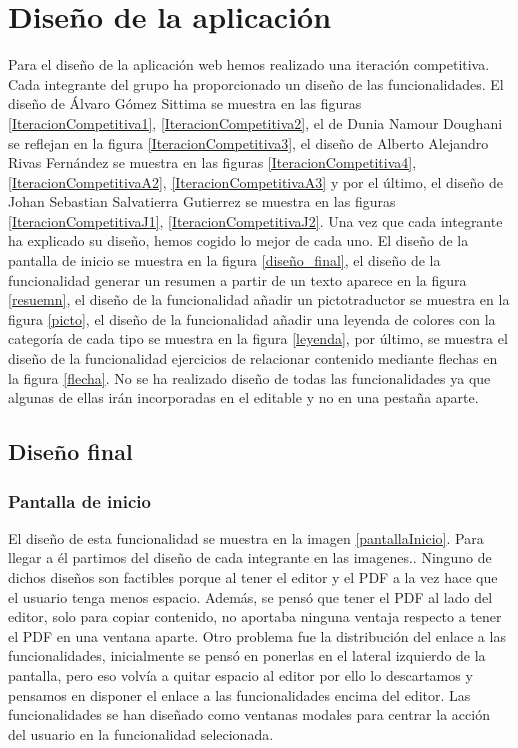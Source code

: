 \section{Diseño de la aplicación}
\label{disenyoDeLaAplicacion}
Para el diseño de la aplicación web hemos realizado una iteración competitiva. Cada integrante del grupo ha proporcionado un diseño de las funcionalidades. El diseño de Álvaro Gómez Sittima se muestra en las figuras \ref{IteracionCompetitiva1}, \ref{IteracionCompetitiva2}, el de Dunia Namour Doughani se reflejan en la figura \ref{IteracionCompetitiva3}, el diseño de Alberto Alejandro Rivas Fernández se muestra en las figuras \ref{IteracionCompetitiva4}, \ref{IteracionCompetitivaA2}, \ref{IteracionCompetitivaA3} y por el último, el diseño de Johan Sebastian Salvatierra Gutierrez se muestra en las figuras \ref{IteracionCompetitivaJ1}, \ref{IteracionCompetitivaJ2}. Una vez que cada integrante ha explicado su diseño, hemos cogido lo mejor de cada uno. El diseño de la pantalla de inicio se muestra en la figura \ref{diseño_final}, el diseño de la funcionalidad generar un resumen a partir de un texto aparece en la figura \ref{resuemn}, el diseño de la funcionalidad añadir un pictotraductor se muestra en la figura \ref{picto}, el diseño de la funcionalidad añadir una leyenda de colores con la categoría de cada tipo se muestra en la figura \ref{leyenda}, por último, se muestra el diseño de la funcionalidad ejercicios de relacionar contenido mediante flechas en la figura \ref{flecha}. No se ha realizado diseño de todas las funcionalidades ya que algunas de ellas irán incorporadas en el editable y no en una pestaña aparte.

\subsection{Diseño final}

\subsubsection{Pantalla de inicio}
El diseño de esta funcionalidad se muestra en la imagen \ref{pantallaInicio}. Para llegar a él partimos del diseño de cada integrante en las imagenes.. Ninguno de dichos diseños son factibles porque al tener el editor y el PDF a la vez hace que el usuario tenga menos espacio. Además, se pensó que tener el PDF al lado del editor, solo para copiar contenido, no aportaba ninguna ventaja respecto a tener el PDF en una ventana aparte. Otro problema fue la distribución del enlace a las funcionalidades, inicialmente se pensó en ponerlas en el lateral izquierdo de la pantalla, pero eso volvía a quitar espacio al editor por ello lo descartamos y pensamos en disponer el enlace a las funcionalidades encima del editor. Las funcionalidades se han diseñado como ventanas modales para centrar la acción del usuario en la funcionalidad selecionada. 

